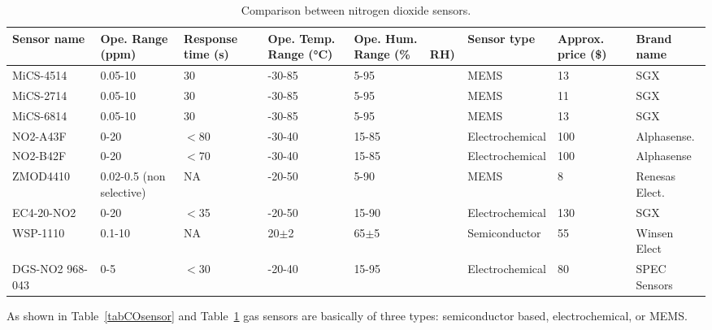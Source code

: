 \documentclass[10pt]{../imeko_acta}
\begin{document}
\begin{table}[!h]
	\caption{Comparison between nitrogen dioxide sensors.}
        \label{tabNO2sensor}
	\centering
    \begin{tabular}{p{3cm}p{1.5cm}p{1.5cm}p{1.5cm}p{1.5cm}p{2cm}p{1.5cm}p{2cm}}
        \toprule
	Sensor name	& Ope. Range (\unit{ppm})& Response time (\unit{\s})& Ope. Temp. Range (\unit{\degreeCelsius})     & Ope. Hum. Range (\unit{\percent\ RH})& Sensor type& Approx. price (\$) & Brand name\\
        \midrule
	MiCS-4514~\cite{MICS4514} & 0.05-10 & 30 & -30-85 & 5-95 & MEMS & 13 & SGX \\
	MiCS-2714~\cite{MICS2714} & 0.05-10 & 30 & -30-85 & 5-95 & MEMS & 11 & SGX \\
	MiCS-6814~\cite{MICS6814} & 0.05-10 & 30 & -30-85 & 5-95 & MEMS & 13 & SGX \\
	NO2-A43F~\cite{NO2A43F} & 0-20 & $<$80 & -30-40 & 15-85 & Electrochemical & 100 & Alphasense.\\
	NO2-B42F~\cite{NO2B42F} & 0-20 & $<$70 & -30-40 & 15-85 & Electrochemical & 100 & Alphasense\\
	ZMOD4410~\cite{ZMOD4410} & 0.02-0.5 (non selective) & NA & -20-50 & 5-90 & MEMS & 8 & Renesas Elect.\\
	EC4-20-NO2~\cite{EC4-20-NO2} & 0-20 & $<$35 & -20-50 & 15-90 & Electrochemical & 130 & SGX\\
	WSP-1110~\cite{WSP-1110} & 0.1-10 & NA & 20$\pm$2 & 65$\pm$5 & Semiconductor & 55 & Winsen Elect \\
	DGS-NO2 968-043~\cite{DGS-NO2-968-043} & 0-5 & $<$30 & -20-40 & 15-95 & Electrochemical & 80 & SPEC Sensors\\
	\bottomrule
    \end{tabular}
\end{table}

As shown in Table~\ref{tabCOsensor} and Table~\ref{tabNO2sensor} gas sensors are basically of three types: semiconductor based, electrochemical, or MEMS.
\end{document}
